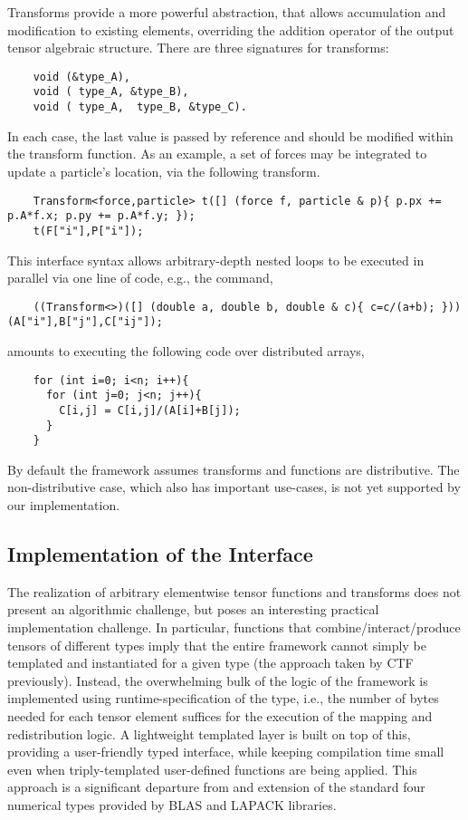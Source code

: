 Transforms provide a more powerful abstraction, that allows accumulation and modification to existing elements, overriding the addition operator of the output tensor algebraic structure.
There are three signatures for transforms:
\begin{lstlisting}
    void (&type_A), 
    void ( type_A, &type_B),
    void ( type_A,  type_B, &type_C).
\end{lstlisting}
In each case, the last value is passed by reference and should be modified within the transform function.
As an example, a set of forces may be integrated to update a particle's location, via the following transform.
\begin{lstlisting}
    Transform<force,particle> t([] (force f, particle & p){ p.px += p.A*f.x; p.py += p.A*f.y; });
    t(F["i"],P["i"]);
\end{lstlisting}
This interface syntax allows arbitrary-depth nested loops to be executed in parallel via one line of code, e.g., the command,
\begin{lstlisting}
    ((Transform<>)([] (double a, double b, double & c){ c=c/(a+b); }))(A["i"],B["j"],C["ij"]);
\end{lstlisting}
amounts to executing the following code over distributed arrays,
\begin{lstlisting}
    for (int i=0; i<n; i++){
      for (int j=0; j<n; j++){
        C[i,j] = C[i,j]/(A[i]+B[j]);
      }
    }
\end{lstlisting}
By default the framework assumes transforms and functions are distributive.
The non-distributive case, which also has important use-cases, is not yet supported by our implementation.

\subsection{Implementation of the Interface}

The realization of arbitrary elementwise tensor functions and transforms does not present an algorithmic challenge, but poses an interesting practical implementation challenge.
In particular, functions that combine/interact/produce tensors of different types imply that the entire framework cannot simply be templated and instantiated for a given type (the approach taken by CTF previously).
Instead, the overwhelming bulk of the logic of the framework is implemented using runtime-specification of the type, i.e., the number of bytes needed for each tensor element suffices for the execution of the mapping and redistribution logic.
A lightweight templated layer is built on top of this, providing a user-friendly typed interface, while keeping compilation time small even when triply-templated user-defined functions are being applied.
This approach is a significant departure from and extension of the standard four numerical types provided by BLAS and LAPACK libraries.









